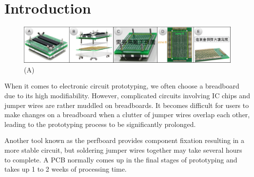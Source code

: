 \section{Introduction}

\begin{figure}[t]
 \begin{center}
  \includegraphics[width=2\columnwidth]{figures/Figure1Temp_v2.pdf}
  \caption{
    (A) 
  }
  \label{fig:System_Flow}
  \end{center}
\end{figure}



When it comes to electronic circuit prototyping, we often choose a breadboard due to its high modifiability. However, complicated circuits involving IC chips and jumper wires are rather muddled on breadboards. It becomes difficult for users to make changes on a breadboard when a clutter of jumper wires overlap each other, leading to the prototyping process to be significantly prolonged. %


Another tool known as the perfboard provides component fixation resulting in a more stable circuit, but soldering jumper wires together may take several hours to complete. A PCB normally comes up in the final stages of prototyping and takes up 1 to 2 weeks of processing time.%

